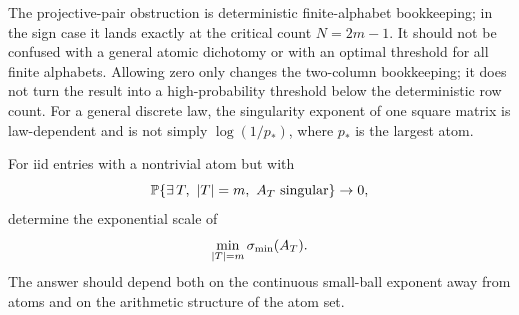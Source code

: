The projective-pair obstruction is deterministic finite-alphabet bookkeeping;
in the sign case it lands exactly at the critical count \(N=2m-1\).  It should
not be confused with a general atomic dichotomy or with an optimal threshold
for all finite alphabets.  Allowing zero only changes the two-column
bookkeeping; it does not turn the result into a high-probability threshold below
the deterministic row count.  For a general discrete law, the singularity
exponent of one square matrix is law-dependent and is not simply
\(\log(1/p_*)\), where \(p_*\) is the largest atom.

\begin{problem}
For iid entries with a nontrivial atom but with
\[
  \mathbb{P}\{\exists\,T,\ |T|=m,\ A_T\hbox{ singular}\}\to0,
\]
determine the exponential scale of
\[
  \min_{|T|=m}\sigma_{\min}(A_T).
\]
The answer should depend both on the continuous small-ball exponent away from
atoms and on the arithmetic structure of the atom set.
\end{problem}
